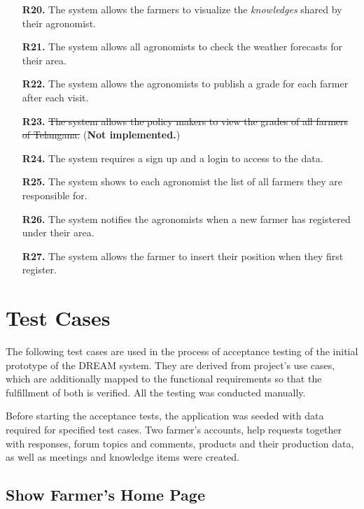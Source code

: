 \begin{enumerate}
	\item [\textbf{R20.}] The system allows the farmers to visualize the \textit{knowledges} shared by their agronomist.
	\item [\textbf{R21.}] The system allows all agronomists to check the weather forecasts for their area.
	\item [\textbf{R22.}] The system allows the agronomists to publish a grade for each farmer after each visit.
	\item [\textbf{R23.}] \sout{The system allows the policy makers to view the grades of all farmers of Telangana.} (\textbf{Not implemented.})
	\item [\textbf{R24.}] The system requires a sign up and a login to access to the data.
	\item [\textbf{R25.}] The system shows to each agronomist the list of all farmers they are responsible for.
	\item [\textbf{R26.}] The system notifies the agronomists when a new farmer has registered under their area.
	\item [\textbf{R27.}] The system allows the farmer to insert their position when they first register.
\end{enumerate}

\section{Test Cases} \label{sec:test_cases}

The following test cases are used in the process of acceptance testing of the initial prototype of the DREAM system. They are derived from project's use cases, which are additionally mapped to the functional requirements so that the fulfillment of both is verified. All the testing was conducted manually.

Before starting the acceptance tests, the application was seeded with data required for specified test cases. Two farmer's accounts, help requests together with responses, forum topics and comments, products and their production data, as well as meetings and knowledge items were created.

\subsection{Show Farmer's Home Page}

